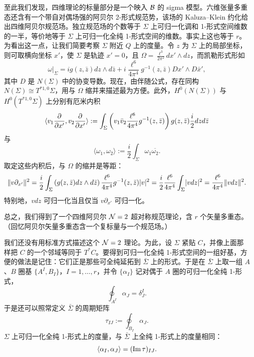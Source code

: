 至此我们发现，四维理论的标量部分是一个映入 $\mathcal{B}$ 的 sigma 模型。六维张量多重态还含有一个带自对偶场强的阿贝尔 2-形式规范势，该场的 Kaluza–Klein 约化给出四维阿贝尔规范场。独立规范场的个数等于 $\Sigma$ 上可归一化调和 1-形式空间维数的一半，等价地等于 $\Sigma$ 上可归一化全纯 1-形式空间的维数。事实上这也等于 $r$。为看出这一点，让我们简要考察 $\Sigma$ 附近 $Q$ 上的度量。令 $z$ 为 $\Sigma$ 上的局部坐标，则可取横向坐标 $x'$，使 $\Sigma$ 是轨迹 $x' = 0$，且 $\Omega = \frac{\ell^3}{2 \pi^2} dx' \wedge dz$，而凯勒形式形如
\begin{equation}
\omega \vert_\Sigma = i g(z, \bar{z}) d z \wedge d \bar{z} + i \frac{\ell^6}{4 \pi^4} g^{-1}(z, \bar{z}) Dx' \wedge D\bar{x}',
\end{equation}
其中 $D$ 是 $N(\Sigma)$ 中的协变导数。现在，由伴随公式，存在同构 $N(\Sigma) \cong T^{*1,0}\Sigma$，用与 $\Omega$ 缩并来描述最为方便。此外，$H^0(N(\Sigma))$ 与 $H^0(T^{*1,0}\Sigma)$ 上分别有厄米内积
\begin{equation}
\langle v_1 \frac{\partial}{\partial x'}, v_2 \frac{\partial}{\partial x'} \rangle:=
\int_{\Sigma} \left( v_1 \bar v_2 \frac{\ell^6}{4\pi^4}
g^{-1}(z,\bar z) \right) g(z, \bar z) \frac{i}{2} dz d\bar z
\end{equation}
与
\begin{equation}
\langle \omega_1, \omega_2 \rangle:=  \frac{i}{2} \int_{\Sigma}
\omega_1 \overline{\omega_2}.
\end{equation}
取定这些内积后，与 $\Omega$ 的缩并是等距：
\begin{equation} \label{eq:inprod-equiv}
\lVert v \partial_{x'} \rVert^2 = \frac{i}{2}\int_{\Sigma} \left( g(z,
\bar{z}) dz \wedge d\bar{z} \right) \frac{\ell^6}{4 \pi^4} g^{-1}(z,
\bar{z}) \lvert v \rvert^2 = \frac{i}{2} \frac{\ell^6}{4 \pi^4}
\int_{\Sigma} \lvert v dz \rvert^2 = \frac{\ell^6}{4 \pi^4} \lVert v dz \rVert^2.
\end{equation}
特别地，$v dz$ 可归一化当且仅当 $v \partial_{x'}$ 可归一化。

总之，我们得到了一个四维阿贝尔 $\mathcal{N}=2$ 超对称规范理论，含 $r$ 个矢量多重态。（回忆阿贝尔矢量多重态含一个复标量与一个规范场。）

我们还没有用标准方式描述这个 $\mathcal{N}=2$ 理论。为此，设 $\Sigma$ 紧贴 $C$，并像上面那样把 $C$ 的一个邻域等同于 $T^* C$。要得到可归一化全纯 1-形式空间的一组好基，方便的做法是记住：它们正是那些可全纯延拓到 $\bar\Sigma$ 上的形式。于是在 $\bar\Sigma$ 上取一组 $A$、$B$ 圈基 $\{A^I, B_I\}$，$I=1,\dots, r$，并令 $\{\alpha_I\}$ 记对偶于 $A$ 圈的可归一化全纯 1-形式，
\begin{equation}
\oint_{A^I} \alpha_J = \delta^I_J.
\end{equation}
于是还可以照常定义 $\bar\Sigma$ 的周期矩阵
\begin{equation}
\tau_{IJ} := \oint_{B_I} \alpha_J.
\end{equation}
$\Sigma$ 上可归一化全纯 1-形式上的度量，与 $\bar\Sigma$ 上全纯 1-形式上的度量相同：
\begin{equation} \label{eq:metric-1-forms}
\langle \alpha_I, \alpha_J \rangle = (\operatorname{Im} \tau)_{IJ}.
\end{equation}

